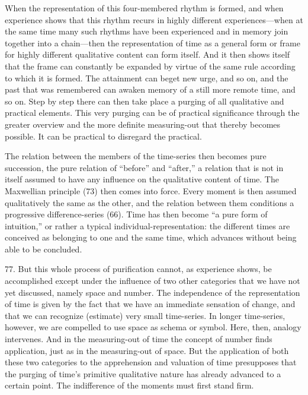 \documentclass[12pt,a4paper]{book}
\newcommand{\opage}[1]{\marginnote{\footnotesize\textit{[#1]}}}
\begin{document}
When the representation of this four-membered rhythm is formed, and when
experience shows that this rhythm recurs in highly different
experiences---when at the same time many such rhythms have been experienced
and in memory join together into a chain---then the representation of time as
a general form or frame for highly different qualitative content can form
itself. And it then shows itself that the frame can constantly be expanded by
virtue of the same rule according to which it is formed. The attainment can
beget new urge, and so on, and the past that was remembered can awaken memory
of a still more remote time, and so on. Step by step there can then take
place a \opage{188}purging of all qualitative and practical elements. This very purging
can be of practical significance through the greater overview and the more
definite measuring-out that thereby becomes possible. It can be practical to
disregard the practical.

The relation between the members of the time-series then becomes pure
succession, the pure relation of ``before'' and ``after,'' a relation that is
not in itself assumed to have any influence on the qualitative content of
time. The Maxwellian principle (73) then comes into force. Every moment is
then assumed qualitatively the same as the other, and the relation between
them conditions a progressive difference-series (66). Time has then become
``a pure form of intuition,'' or rather a typical individual-representation:
the different times are conceived as belonging to one and the same time,
which advances without being able to be concluded.

77. But this whole process of purification cannot, as experience shows, be
accomplished except under the influence of two other categories that we have
not yet discussed, namely space and number. The independence of the
representation of time is given by the fact that we have an immediate
sensation of change, and that we can recognize (estimate) very small
time-series. In longer time-series, however, we are compelled to use space as
schema or symbol. Here, then, analogy intervenes. And in the measuring-out of
time the concept of number finds application, just as in the measuring-out of
space. But the application of both these two categories to the apprehension
and valuation of time presupposes that the purging of time's primitive
qualitative nature has already advanced to a certain point. The indifference
of the moments must first stand firm.
\end{document}
